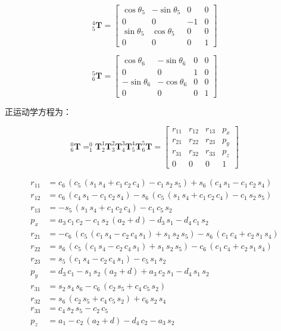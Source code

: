 \documentclass{homework}
\begin{document}
\begin{sol}
\[
  _5^4\mathbf{T} =
  \begin{bmatrix}
    \cos\theta_5 & -\sin\theta_5 & 0 & 0 \\
    0 & 0 & -1 & 0 \\
    \sin\theta_5 & \cos\theta_5 & 0 & 0 \\
    0 & 0 & 0 & 1
  \end{bmatrix}
\]

\[
  _6^5\mathbf{T} =
  \begin{bmatrix}
    \cos\theta_6 & -\sin\theta_6 & 0 & 0 \\
    0 & 0 & 1 & 0 \\
    -\sin\theta_6 & -\cos\theta_6 & 0 & 0 \\
    0 & 0 & 0 & 1
  \end{bmatrix}
\]

正运动学方程为：

\[
  _6^0\mathbf{T} = _1^0\mathbf{T} _2^1\mathbf{T} _3^2\mathbf{T} _4^3\mathbf{T} _5^4\mathbf{T} _6^5\mathbf{T} =
  \begin{bmatrix} 
r_{11} & r_{12} & r_{13} & p_x \\ 
r_{21} & r_{22} & r_{23} & p_y \\ 
r_{31} & r_{32} & r_{33} & p_z \\ 
0 & 0 & 0 & 1
\end{bmatrix}
\] 

\begin{align*} 
r_{11} &= c_{6}\,\left(c_{5}\,\left(s_{1}\,s_{4}+c_{1}\,c_{2}\,c_{4}\right)-c_{1}\,s_{2}\,s_{5}\right)+s_{6}\,\left(c_{4}\,s_{1}-c_{1}\,c_{2}\,s_{4}\right) \\ 
r_{12} &= c_{6}\,\left(c_{4}\,s_{1}-c_{1}\,c_{2}\,s_{4}\right)-s_{6}\,\left(c_{5}\,\left(s_{1}\,s_{4}+c_{1}\,c_{2}\,c_{4}\right)-c_{1}\,s_{2}\,s_{5}\right) \\ 
r_{13} &= -s_{5}\,\left(s_{1}\,s_{4}+c_{1}\,c_{2}\,c_{4}\right)-c_{1}\,c_{5}\,s_{2} \\ 
p_x &= a_{3}\,c_{1}\,c_{2}-c_{1}\,s_{2}\,\left(a_{2}+d\right)-d_{3}\,s_{1}-d_{4}\,c_{1}\,s_{2} \\ 
r_{21} &= -c_{6}\,\left(c_{5}\,\left(c_{1}\,s_{4}-c_{2}\,c_{4}\,s_{1}\right)+s_{1}\,s_{2}\,s_{5}\right)-s_{6}\,\left(c_{1}\,c_{4}+c_{2}\,s_{1}\,s_{4}\right) \\ 
r_{22} &= s_{6}\,\left(c_{5}\,\left(c_{1}\,s_{4}-c_{2}\,c_{4}\,s_{1}\right)+s_{1}\,s_{2}\,s_{5}\right)-c_{6}\,\left(c_{1}\,c_{4}+c_{2}\,s_{1}\,s_{4}\right) \\ 
r_{23} &= s_{5}\,\left(c_{1}\,s_{4}-c_{2}\,c_{4}\,s_{1}\right)-c_{5}\,s_{1}\,s_{2} \\ 
p_y &= d_{3}\,c_{1}-s_{1}\,s_{2}\,\left(a_{2}+d\right)+a_{3}\,c_{2}\,s_{1}-d_{4}\,s_{1}\,s_{2} \\ 
r_{31} &= s_{2}\,s_{4}\,s_{6}-c_{6}\,\left(c_{2}\,s_{5}+c_{4}\,c_{5}\,s_{2}\right) \\ 
r_{32} &= s_{6}\,\left(c_{2}\,s_{5}+c_{4}\,c_{5}\,s_{2}\right)+c_{6}\,s_{2}\,s_{4} \\ 
r_{33} &= c_{4}\,s_{2}\,s_{5}-c_{2}\,c_{5} \\ 
p_z &= a_{1}-c_{2}\,\left(a_{2}+d\right)-d_{4}\,c_{2}-a_{3}\,s_{2}
\end{align*}


\end{sol}
\end{document}
